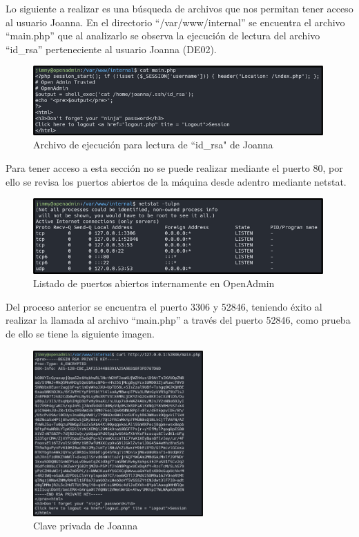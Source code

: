 Lo siguiente a realizar es una búsqueda de archivos que nos permitan tener acceso al usuario Joanna. En el directorio “/var/www/internal” se encuentra el archivo “main.php” que al analizarlo se observa la ejecución de lectura del archivo “id\_rsa” perteneciente al usuario Joanna (DE02).
\begin{figure}[H]
    \centering
    \includegraphics[width=0.99\textwidth]{imagenes/idjoa.png}
    \caption{Archivo de ejecución para lectura de ``id\_rsa" de Joanna}
\end{figure}
Para tener acceso a esta sección no se puede realizar mediante el puerto 80, por ello se revisa los puertos abiertos de la máquina desde adentro mediante netstat.
\begin{figure}[H]
    \centering
    \includegraphics[width=0.99\textwidth]{imagenes/listpa.png}
    \caption{Listado de puertos abiertos internamente en OpenAdmin}
\end{figure}
Del proceso anterior se encuentra el puerto 3306 y 52846, teniendo éxito al realizar la llamada al archivo “main.php” a través del puerto 52846, como prueba de ello se tiene la siguiente imagen.
\begin{figure}[H]
    \centering
    \includegraphics[width=0.58\textwidth]{imagenes/claprjoa.png}
    \caption{Clave privada de Joanna}
\end{figure}
